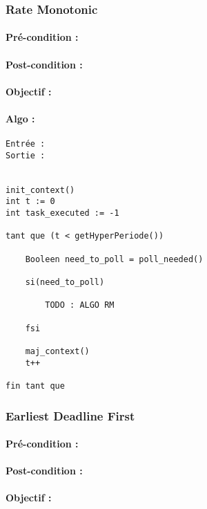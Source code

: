 			\subsubsection{Rate Monotonic}
				\paragraph{Pré-condition :} 
				\paragraph{Post-condition :} 
				\paragraph{Objectif :} 
				\paragraph{Algo :} 
					\begin{verbatim}
Entrée : 
Sortie :  


init_context()
int t := 0
int task_executed := -1

tant que (t < getHyperPeriode())
	
    Booleen need_to_poll = poll_needed()
	
    si(need_to_poll)
        
        TODO : ALGO RM
        
    fsi
	
    maj_context()
    t++
	
fin tant que
					\end{verbatim}
					
					
			\subsubsection{Earliest Deadline First}
			
				\paragraph{Pré-condition :} 
				\paragraph{Post-condition :} 
				\paragraph{Objectif :} 
